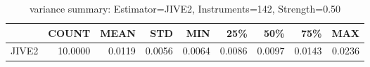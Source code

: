 \begin{table}[ht]
\centering
\caption{variance summary: Estimator=JIVE2, Instruments=142, Strength=0.50}
\begin{tabular}{lrrrrrrrr}
\toprule
 & COUNT & MEAN & STD & MIN & 25\% & 50\% & 75\% & MAX \\
\midrule
JIVE2 & 10.0000 & 0.0119 & 0.0056 & 0.0064 & 0.0086 & 0.0097 & 0.0143 & 0.0236 \\
\bottomrule
\end{tabular}
\end{table}
